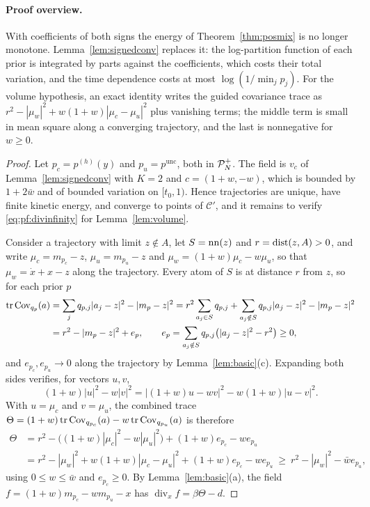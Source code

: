 \documentclass{article} %
\theoremstyle{plain}
\theoremstyle{definition}
\theoremstyle{remark}
\begin{document}
\label{apx:pf-schedule}
\thmschedule*
\paragraph{Proof overview.} With coefficients of both signs the energy of
Theorem~\ref{thm:posmix} is no longer monotone. Lemma~\ref{lem:signedconv} replaces it: the
log-partition function of each prior is integrated by parts against the coefficients, which costs
their total variation, and the time dependence costs at most $\log(1/\min_jp_j)$. For the volume
hypothesis, an exact identity writes the guided covariance trace as
$r^2-|\mu_w|^2+w(1+w)|\mu_c-\mu_u|^2$ plus vanishing terms; the middle term is small in mean
square along a converging trajectory, and the last is nonnegative for $w\ge0$.
\begin{proof}
Let $p_c=p^{(h)}(y)$ and $p_u=p^{\mathrm{unc}}$, both in $\mathcal{P}_N^{+}$. The field is $v_c$ of
Lemma~\ref{lem:signedconv} with $K=2$ and $c=(1+w,-w)$, which is bounded by $1+2\bar w$ and of
bounded variation on $[t_0,1)$. Hence trajectories are unique, have finite kinetic energy, and
converge to points of $\mathcal C'$, and it remains to verify \eqref{eq:pf:divinfinity} for
Lemma~\ref{lem:volume}.

Consider a trajectory with limit $z\notin A$, let $S=\operatorname{nn}(z)$ and $r=\operatorname{dist}(z,A)>0$, and write
$\mu_c=m_{p_c}-z$, $\mu_u=m_{p_u}-z$ and $\mu_w=(1+w)\mu_c-w\mu_u$, so that $\mu_w=\dot x+x-z$
along the trajectory. Every atom of $S$ is at distance $r$ from $z$, so for each prior $p$
\begin{align*}
\operatorname{tr}\operatorname{Cov}_{q_p}(a)
&=\sum_jq_{p,j}|a_j-z|^2-|m_p-z|^2
=r^2\sum_{a_j\in S}q_{p,j}+\sum_{a_j\notin S}q_{p,j}|a_j-z|^2-|m_p-z|^2\\
&=r^2-|m_p-z|^2+e_p,\qquad
e_p=\sum_{a_j\notin S}q_{p,j}\bigl(|a_j-z|^2-r^2\bigr)\ge0,
\end{align*}
and $e_{p_c},e_{p_u}\to0$ along the trajectory by Lemma~\ref{lem:basic}(c). Expanding both sides
verifies, for vectors $u,v$,
\[
(1+w)|u|^2-w|v|^2=|(1+w)u-wv|^2-w(1+w)|u-v|^2 .
\]
With $u=\mu_c$ and $v=\mu_u$, the combined trace
$\Theta=(1+w)\operatorname{tr}\operatorname{Cov}_{q_{p_c}}(a)-w\operatorname{tr}\operatorname{Cov}_{q_{p_u}}(a)$ is therefore
\begin{align*}
\Theta
&=r^2-\bigl((1+w)|\mu_c|^2-w|\mu_u|^2\bigr)+(1+w)e_{p_c}-we_{p_u}\\
&=r^2-|\mu_w|^2+w(1+w)|\mu_c-\mu_u|^2+(1+w)e_{p_c}-we_{p_u}
\ \ge\ r^2-|\mu_w|^2-\bar we_{p_u},
\end{align*}
using $0\le w\le\bar w$ and $e_{p_c}\ge0$. By Lemma~\ref{lem:basic}(a), the field
$f=(1+w)m_{p_c}-wm_{p_u}-x$ has $\operatorname{div}_xf=\beta\Theta-d$.


\end{proof}
\end{document}
